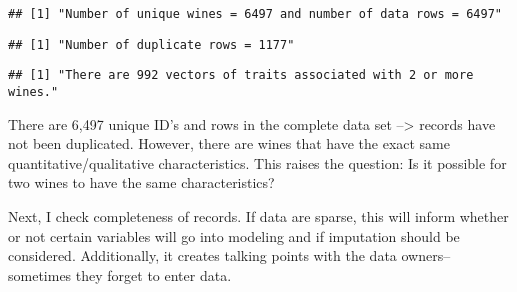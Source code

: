 \documentclass[
]{article}
\newenvironment{Shaded}{\begin{snugshade}}{\end{snugshade}}
\newcommand{\KeywordTok}[1]{\textcolor[rgb]{0.13,0.29,0.53}{\textbf{#1}}}
\newcommand{\NormalTok}[1]{#1}
\newcommand{\OperatorTok}[1]{\textcolor[rgb]{0.81,0.36,0.00}{\textbf{#1}}}
\newcommand{\StringTok}[1]{\textcolor[rgb]{0.31,0.60,0.02}{#1}}
\begin{document}
\begin{verbatim}
## [1] "Number of unique wines = 6497 and number of data rows = 6497"
\end{verbatim}

\begin{Shaded}
\end{Shaded}

\begin{verbatim}
## [1] "Number of duplicate rows = 1177"
\end{verbatim}

\begin{Shaded}
\end{Shaded}

\begin{verbatim}
## [1] "There are 992 vectors of traits associated with 2 or more wines."
\end{verbatim}

There are 6,497 unique ID's and rows in the complete data set
--\textgreater{} records have not been duplicated. However, there are
wines that have the exact same quantitative/qualitative characteristics.
This raises the question: Is it possible for two wines to have the same
characteristics?

Next, I check completeness of records. If data are sparse, this will
inform whether or not certain variables will go into modeling and if
imputation should be considered. Additionally, it creates talking points
with the data owners--sometimes they forget to enter data.

\begin{Shaded}
\end{Shaded}
\end{document}
